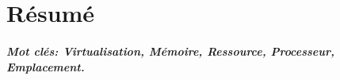 %
%
%

\chapter*{R\'{e}sum\'{e}}
 \lipsum[3]

\paragraph{Mot cl\'{e}s: Virtualisation, M\'{e}moire, Ressource, Processeur, Emplacement.}

\clearpage